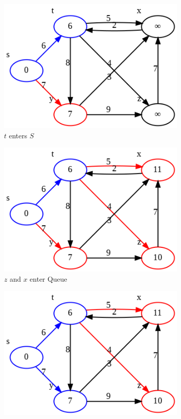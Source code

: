 \documentclass[../main.tex]{subfiles}
\begin{document}
\begin{figure}[!ht]
    \begin{subfigure}{.32\textwidth}
    \includegraphics[width=0.99\columnwidth]{fig/dijkstra_1.5.png}
    \caption{$t$ enters $S$}
    \end{subfigure}
    \begin{subfigure}{.32\textwidth}
    \includegraphics[width=0.99\columnwidth]{fig/dijkstra_2.png}
    \caption{$z$ and $x$ enter Queue}
    \end{subfigure}
    \begin{subfigure}{.32\textwidth}
    \includegraphics[width=0.99\columnwidth]{fig/dijkstra_2.5.png}

\end{subfigure}
\end{figure}
\end{document}
